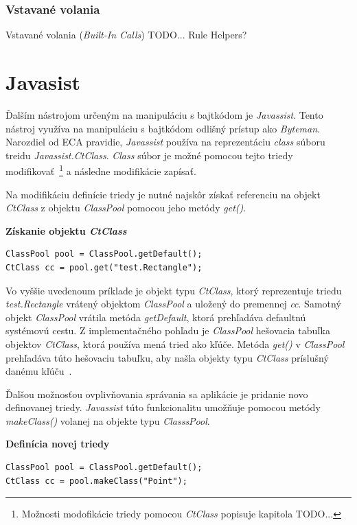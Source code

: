 \documentclass[11pt,final,oneside]{fithesis}
\newenvironment{example}[1]
{
\vspace{3mm}
\noindent\textbf{#1}
\vspace{2mm}
}
{
\vspace{3mm}
}
\begin{document}
\subsection{Vstavané volania}

Vstavané volania (\textit{Built-In Calls})
TODO...
Rule Helpers?

\chapter{Javasist}

Ďalším nástrojom určeným na manipuláciu s bajtkódom je \textit{Javassist}. Tento nástroj využíva na manipuláciu s bajtkódom odlišný prístup ako
\textit{Byteman}. Narozdiel od ECA pravidie, \textit{Javassist} používa na reprezentáciu \textit{class} súboru treidu \textit{Javassist.CtClass}.
\textit{Class} súbor je možné pomocou tejto triedy
modifikovať~\footnote{Možnosti modofikácie triedy pomocou \textit{CtClass} popisuje kapitola TODO...} a následne modifikácie zapísať.

Na modifikáciu definície triedy je nutné najskôr získať referenciu na objekt
\textit{CtClass} z objektu \textit{ClassPool} pomocou jeho metódy
\textit{get()}.

\begin{example}{Získanie objektu \textit{CtClass}}
\begin{verbatim}
ClassPool pool = ClassPool.getDefault();
CtClass cc = pool.get("test.Rectangle");
\end{verbatim}
\end{example}

Vo vyššie uvedenoum príklade je objekt typu \textit{CtClass}, ktorý reprezentuje triedu \textit{test.Rectangle} vrátený objektom \textit{ClassPool} a uložený do premennej \textit{cc}. Samotný objekt \textit{ClassPool} vrátila metóda \textit{getDefault}, ktorá prehľadáva defaultnú systémovú cestu. Z implementačného pohľadu je \textit{ClassPool} hešovacia tabuľka objektov
\textit{CtClass}, ktorá používa mená tried ako kľúče. Metóda \textit{get()} v
\textit{ClassPool} prehľadáva túto hešovaciu tabuľku, aby našla objekty typu
\textit{CtClass} príslušný danému kľúču~\cite{Chiba:Javassist}.

Ďalšou možnosťou ovplivňovania správania sa aplikácie je pridanie novo definovanej triedy. \textit{Javassist} túto funkcionalitu umožňuje pomocou metódy \textit{makeClass()} volanej na objekte typu \textit{ClasssPool}.

\begin{example}{Definícia novej triedy}
\begin{verbatim}
ClassPool pool = ClassPool.getDefault();
CtClass cc = pool.makeClass("Point");
\end{verbatim}
\end{example}
\end{document}
